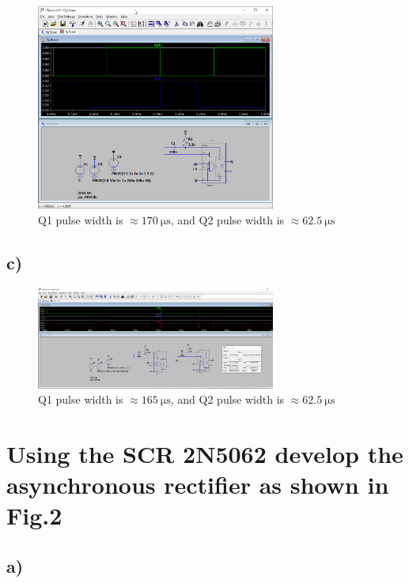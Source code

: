 \documentclass{article}
\begin{document}
	\begin{figure}[H]
	    \centering
	    \includegraphics[width=0.7\textwidth]{1b}
	    \caption{Q1 pulse width is $\approx \SI{170}{\micro\second}$, and Q2 pulse width is $\approx \SI{62.5}{\micro\second}$}
	\end{figure}
	
	\subsection*{c)}

	\begin{figure}[H]
	    \centering
	    \includegraphics[width=0.7\textwidth]{1c}
	    \caption{Q1 pulse width is $\approx \SI{165}{\micro\second}$, and Q2 pulse width is $\approx \SI{62.5}{\micro\second}$}
	\end{figure}


	\section{Using the SCR 2N5062 develop the asynchronous rectifier as shown in Fig.2}
	
	\subsection*{a)}
	
\end{document}
